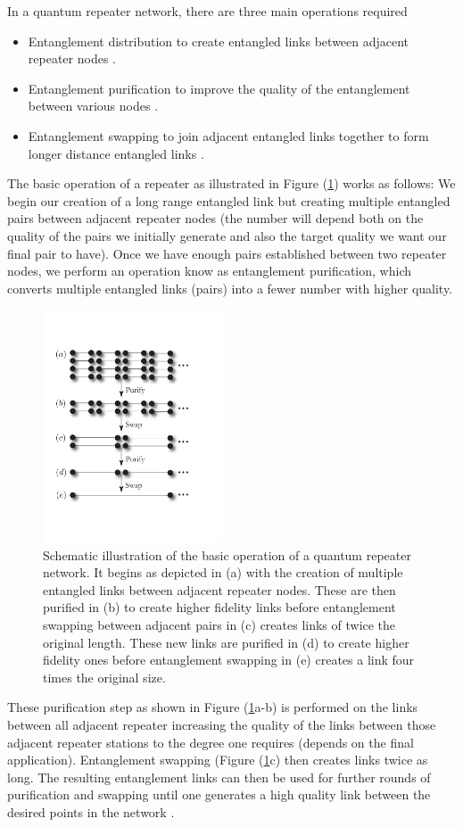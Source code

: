 \documentclass[twocolumn, aps, rmp, amsmath, amssymb, nofootinbib, superscriptaddress, longbibliography, floatfix, table-of-contents, eqsecnum]{revtex4-1}
\begin{document}
In a quantum repeater network, there are three main operations required \cite{}
\begin{itemize}
\item Entanglement distribution to create entangled links between adjacent repeater nodes \cite{}.
\item Entanglement purification to improve the quality of the entanglement between various nodes \cite{}.
\item Entanglement swapping to join adjacent entangled links together to form longer distance entangled links \cite{}.
\end{itemize}
The basic operation of a repeater as illustrated in Figure (\ref{fig2}) works as follows:
We begin our creation of a long range entangled link but creating multiple entangled pairs between adjacent repeater nodes (the number will depend both on the quality of the pairs we initially generate and also the target quality we want our final pair to have). Once we have enough pairs established between two repeater nodes, we perform an operation know as entanglement purification, which converts multiple entangled links (pairs) into a fewer number with higher quality. 
\begin{figure}[!htb]
\begin{center}
\includegraphics[width=0.475\textwidth]{repeaters_2}
\end{center}
\caption{Schematic illustration of the basic operation of a quantum repeater network. It begins as depicted in (a)  with the creation of multiple entangled links between adjacent repeater nodes. These are then purified in (b) to create higher fidelity links before entanglement swapping between adjacent pairs in (c) creates links of twice the original length. These new links are purified in (d) to create higher fidelity ones before entanglement swapping in (e) creates a link four times the original size. } 
\label{fig2}
\end{figure} 
These purification step as shown in Figure (\ref{fig2}a-b) is performed on the links between all adjacent repeater increasing the quality of the links between those adjacent repeater stations to the degree one requires (depends on the final application). Entanglement swapping (Figure (\ref{fig2}c) then creates links twice as long. The resulting entanglement links can then be used for further rounds of purification and swapping until one generates a high quality link between the desired points in the network \cite{}. 
\end{document}
